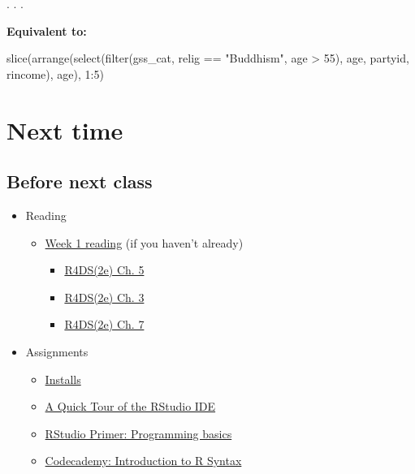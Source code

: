 \documentclass[
  letterpaper,
  DIV=11,
  numbers=noendperiod,
  oneside]{scrartcl}
\newenvironment{Shaded}{\begin{snugshade}}{\end{snugshade}}
\newcommand{\DecValTok}[1]{\textcolor[rgb]{0.68,0.00,0.00}{#1}}
\newcommand{\FunctionTok}[1]{\textcolor[rgb]{0.28,0.35,0.67}{#1}}
\newcommand{\NormalTok}[1]{\textcolor[rgb]{0.00,0.23,0.31}{#1}}
\newcommand{\SpecialCharTok}[1]{\textcolor[rgb]{0.37,0.37,0.37}{#1}}
\newcommand{\StringTok}[1]{\textcolor[rgb]{0.13,0.47,0.30}{#1}}
\providecommand{\tightlist}{%
  \setlength{\itemsep}{0pt}\setlength{\parskip}{0pt}}\usepackage{longtable,booktabs,array}
\begin{document}
. . .

\textbf{Equivalent to:}

\begin{Shaded}
\begin{Highlighting}[]
\FunctionTok{slice}\NormalTok{(}\FunctionTok{arrange}\NormalTok{(}\FunctionTok{select}\NormalTok{(}\FunctionTok{filter}\NormalTok{(gss\_cat, relig }\SpecialCharTok{==} \StringTok{"Buddhism"}\NormalTok{, age }\SpecialCharTok{\textgreater{}} \DecValTok{55}\NormalTok{), age, partyid, rincome), age), }\DecValTok{1}\SpecialCharTok{:}\DecValTok{5}\NormalTok{)}
\end{Highlighting}
\end{Shaded}

\hypertarget{next-time}{%
\section{Next time}\label{next-time}}

\hypertarget{before-next-class}{%
\subsection{Before next class}\label{before-next-class}}

\begin{itemize}
\item
  Reading

  \begin{itemize}
  \tightlist
  \item
    \href{https://jnese.github.io/intro-DS-R_fall-2023/\#week-1-introduction}{Week
    1 reading} (if you haven't already)

    \begin{itemize}
    \tightlist
    \item
      \href{https://r4ds.hadley.nz/workflow-style}{R4DS(2e) Ch. 5}
    \item
      \href{https://r4ds.hadley.nz/workflow-basics}{R4DS(2e) Ch. 3}
    \item
      \href{https://r4ds.hadley.nz/workflow-scripts}{R4DS(2e) Ch. 7}
    \end{itemize}
  \end{itemize}
\item
  Assignments

  \begin{itemize}
  \tightlist
  \item
    \href{https://jnese.github.io/intro-DS-R_fall-2023/install.qmd}{Installs}
  \item
    \href{http://milton-the-cat.rocks/learnr/r/r_getting_started/\#section-a-quick-tour-of-r-studio}{A
    Quick Tour of the RStudio IDE}
  \item
    \href{https://posit.cloud/learn/primers/1.2}{RStudio Primer:
    Programming basics}
  \item
    \href{https://www.codecademy.com/courses/learn-r/lessons/introduction-to-r/exercises/why-r}{Codecademy:
    Introduction to R Syntax}
  \end{itemize}
\end{itemize}
\end{document}
